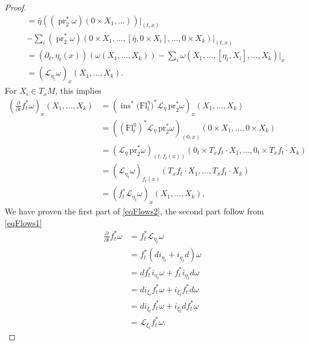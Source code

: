 \documentclass{article}
\theoremstyle{definition}
\begin{document}
\begin{proof}
\begin{equation*}
\begin{split}
            &= \bar{\eta} (( \operatorname{pr}_2^* \omega) (0 \times X_1, \ldots))|_{(t,x)} \\
            &-\sum_i (\operatorname{pr}_2^* \omega) (0 \times X_1, \ldots, [\bar{\eta}, 0 \times X_i], \ldots, 0 \times X_k)|_{(t,x)}\\
            &=\left(\partial_t, \eta_t(x)\right)\left(\omega\left(X_1, \ldots, X_k\right)\right) - \sum_i \omega\left(X_1, \ldots,\left[\eta_t, X_i\right], \ldots, X_k\right)|_x \\ 
            &= \left(\mathcal{L}_{\eta_t} \omega\right)_x\left(X_1, \ldots, X_k\right).
        \end{split}
    \end{equation*}
    For $X_i \in T_xM$, this implies
    \begin{equation}
        \begin{split}
            \left( \frac{\partial}{\partial t} f_t^* \omega \right)_x (X_1, \ldots, X_k) 
            &= \left( \operatorname{ins}^*\bigl(\mathrm{Fl}^{\eta}_t\bigr)^* \mathcal{L}_\eta \, \mathrm{pr}_2^* \omega \right)_x (X_1, \ldots, X_k) \\
            &= \left( \left(\mathrm{Fl}^{\eta}_t\right)^* \mathcal{L}_\eta \, \mathrm{pr}_2^* \omega \right)_{(0,x)} (0 \times X_1, \ldots, 0 \times X_k) \\
            &= \left( \mathcal{L}_\eta \, \mathrm{pr}_2^* \omega \right)_{(t, f_t(x))} (0_t \times T_x f_t \cdot X_1, \ldots, 0_t \times T_x f_t \cdot X_k) \\
            &= \left( \mathcal{L}_{\eta_t} \omega \right)_{f_t(x)} (T_x f_t \cdot X_1, \ldots, T_x f_t \cdot X_k) \\
            &= \left( f_t^* \mathcal{L}_{\eta_t} \omega \right)_x (X_1, \ldots, X_k),
        \end{split}
    \end{equation}
    We have proven the first part of \eqref{eqFlows2}, the second part follow from \eqref{eqFlows1}
    \begin{equation}
        \begin{split}
        \frac{\partial}{\partial t} f_t^* \omega 
        &= f_t^* \mathcal{L}_{\eta_t} \omega \\
        &= f_t^* \left( d i_{\eta_t} + i_{\eta_t} d \right) \omega \\
        &= d f_t^* i_{\eta_t} \omega + f_t^* i_{\eta_t} d \omega \\
        &= d i_{\xi_t} f_t^* \omega + i_{\xi_t} f_t^* d \omega \\
        &= d i_{\xi_t} f_t^* \omega + i_{\xi_t} d f_t^* \omega \\
        &= \mathcal{L}_{\xi_t} f_t^* \omega.
        \end{split}
        \end{equation}
\end{proof}
\end{document}

